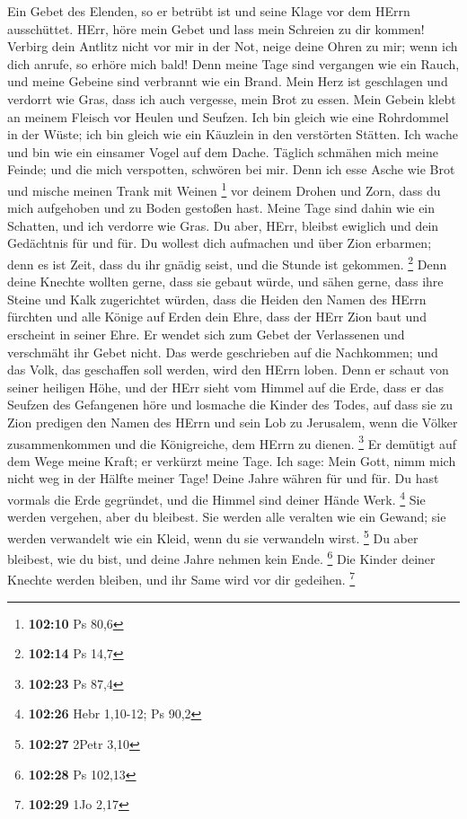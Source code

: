  Ein Gebet des Elenden, so er betrübt ist und seine Klage
vor dem HErrn ausschüttet.  HErr, höre mein Gebet und lass
mein Schreien zu dir kommen!  Verbirg dein Antlitz nicht vor
mir in der Not, neige deine Ohren zu mir; wenn ich dich anrufe, so
erhöre mich bald!  Denn meine Tage sind vergangen wie ein
Rauch, und meine Gebeine sind verbrannt wie ein Brand.  Mein
Herz ist geschlagen und verdorrt wie Gras, dass ich auch vergesse, mein
Brot zu essen.  Mein Gebein klebt an meinem Fleisch vor
Heulen und Seufzen.  Ich bin gleich wie eine Rohrdommel in
der Wüste; ich bin gleich wie ein Käuzlein in den verstörten Stätten.
 Ich wache und bin wie ein einsamer Vogel auf dem Dache.
 Täglich schmähen mich meine Feinde; und die mich
verspotten, schwören bei mir.  Denn ich esse Asche wie Brot
und mische meinen Trank mit Weinen \footnote{\textbf{102:10} Ps 80,6}
 vor deinem Drohen und Zorn, dass du mich aufgehoben und zu
Boden gestoßen hast.  Meine Tage sind dahin wie ein
Schatten, und ich verdorre wie Gras.  Du aber, HErr,
bleibst ewiglich und dein Gedächtnis für und für.  Du
wollest dich aufmachen und über Zion erbarmen; denn es ist Zeit, dass du
ihr gnädig seist, und die Stunde ist gekommen. \footnote{\textbf{102:14}
  Ps 14,7}  Denn deine Knechte wollten gerne, dass sie
gebaut würde, und sähen gerne, dass ihre Steine und Kalk zugerichtet
würden,  dass die Heiden den Namen des HErrn fürchten und
alle Könige auf Erden dein Ehre,  dass der HErr Zion baut
und erscheint in seiner Ehre.  Er wendet sich zum Gebet der
Verlassenen und verschmäht ihr Gebet nicht.  Das werde
geschrieben auf die Nachkommen; und das Volk, das geschaffen soll
werden, wird den HErrn loben.  Denn er schaut von seiner
heiligen Höhe, und der HErr sieht vom Himmel auf die Erde, 
dass er das Seufzen des Gefangenen höre und losmache die Kinder des
Todes,  auf dass sie zu Zion predigen den Namen des HErrn
und sein Lob zu Jerusalem,  wenn die Völker zusammenkommen
und die Königreiche, dem HErrn zu dienen. \footnote{\textbf{102:23} Ps
  87,4}  Er demütigt auf dem Wege meine Kraft; er verkürzt
meine Tage.  Ich sage: Mein Gott, nimm mich nicht weg in
der Hälfte meiner Tage! Deine Jahre währen für und für.  Du
hast vormals die Erde gegründet, und die Himmel sind deiner Hände Werk.
\footnote{\textbf{102:26} Hebr 1,10-12; Ps 90,2}  Sie
werden vergehen, aber du bleibest. Sie werden alle veralten wie ein
Gewand; sie werden verwandelt wie ein Kleid, wenn du sie verwandeln
wirst. \footnote{\textbf{102:27} 2Petr 3,10}  Du aber
bleibest, wie du bist, und deine Jahre nehmen kein Ende. \footnote{\textbf{102:28}
  Ps 102,13}  Die Kinder deiner Knechte werden bleiben, und
ihr Same wird vor dir gedeihen. \footnote{\textbf{102:29} 1Jo 2,17}

